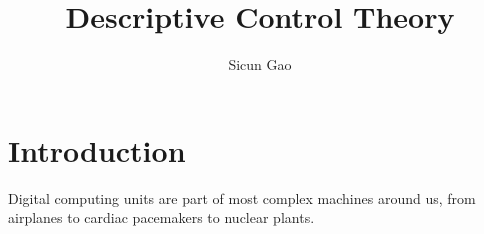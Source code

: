 \documentclass[10pt]{article}
\title{Descriptive Control Theory}
\author{Sicun Gao}
\date{}
\theoremstyle{definition}
\begin{document}
\maketitle
\thispagestyle{empty}

\section{Introduction}

Digital computing units are part of most complex machines around us, from airplanes to cardiac pacemakers to nuclear plants. 

\end{document}
